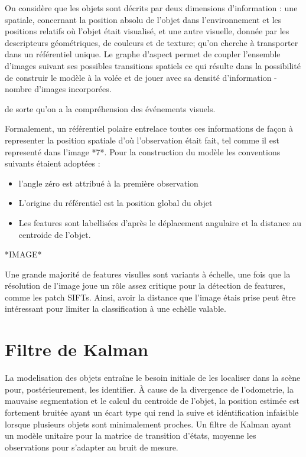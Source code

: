 On considère que les objets sont décrits par deux dimensions
d'information : une spatiale, concernant la position absolu de l'objet
dans l'environnement et les positions relatifs où l'objet était
visualisé, et une autre visuelle, donnée par les descripteurs
géométriques, de couleurs et de texture; qu'on cherche à transporter
dans un référentiel unique. Le graphe d'aspect permet de coupler
l'ensemble d'images suivant ses possibles transitions spatiels ce qui
résulte dans la possibilité de construir le modèle à la volée et de
jouer avec sa densité d'information - nombre d'images incorporées.

de sorte qu'on a la compréhension des événements visuels.

Formalement, un référentiel polaire entrelace toutes ces informations
de façon à representer la position spatiale d'où l'observation était
fait, tel comme il est representé dans l'image *7*. Pour la
construction du modèle les conventions suivants étaient adoptées :
\begin{itemize}
\item l'angle zéro est attribué à la première observation
\item L'origine du référentiel est la position global du objet
\item Les features sont labellisées d'après le déplacement angulaire
  et la distance au centroide de l'objet.
\end{itemize}

*IMAGE*

Une grande majorité de features visulles sont variants à échelle, une
fois que la résolution de l’image joue un rôle assez critique pour la
détection de features, comme les patch SIFTs. Ainsi, avoir la distance
que l’image étais prise peut être intéressant pour limiter la
classification à une echèlle valable.

\section{Filtre de Kalman }

La modelisation des objets entraîne le besoin initiale de les
localiser dans la scène pour, postérieurement, les identifier. À cause
de la divergence de l'odometrie, la mauvaise segmentation et le calcul
du centroide de l'objet, la position estimée est fortement bruitée
ayant un écart type qui rend la suive et idéntification infaisible
lorsque plusieurs objets sont minimalement proches. Un filtre de
Kalman ayant un modèle unitaire pour la matrice de transition d'états,
moyenne les observations pour s'adapter au bruit de mesure.

